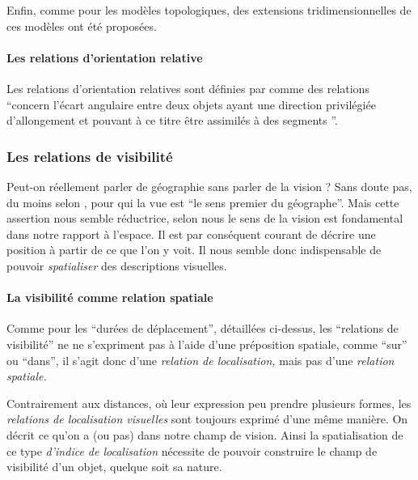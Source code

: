 Enfin, comme pour les modèles topologiques, des extensions
tridimensionnelles de ces modèles ont été proposées.


\paragraph{Les relations d'orientation relative}

Les relations d'orientation relatives sont définies par
\textcite{Duchene2019} comme des relations
\enquote{concern l'écart angulaire entre deux objets
  ayant une direction privilégiée d'allongement et pouvant à ce titre
  être assimilés à des segments \textelp{}}.




\subsubsection{Les relations de visibilité}


\autocite{Llobera2003}

Peut-on réellement parler de géographie sans parler de la vision ?
Sans doute pas, du moins selon \textcite{Brunet1992}, pour qui la vue
est \enquote{le sens premier du géographe}. Mais cette assertion nous
semble réductrice, selon nous le sens de la vision est fondamental
dans notre rapport à l'espace. Il est par conséquent courant de
décrire une position à partir de ce que l'on y voit. Il nous semble
donc indispensable de pouvoir \emph{spatialiser} des descriptions
visuelles.

\paragraph{La visibilité comme relation spatiale}

Comme pour les \enquote{durées de déplacement}, détaillées ci-dessus,
les \enquote{relations de visibilité} ne ne s'expriment pas à l'aide
d'une préposition spatiale, comme \enquote{sur} ou \enquote{dans}, il
s'agit donc d'une \emph{relation de localisation,} mais pas d'une
\emph{relation spatiale.}

Contrairement aux distances, où leur expression peu prendre plusieurs
formes, les \emph{relations de localisation visuelles} sont toujours
exprimé d'une même manière. On décrit ce qu'on a (ou pas) dans notre
champ de vision. Ainsi la spatialisation de ce type \emph{d'indice de
  localisation} nécessite de pouvoir construire le champ de visibilité
d'un objet, quelque soit sa nature.

